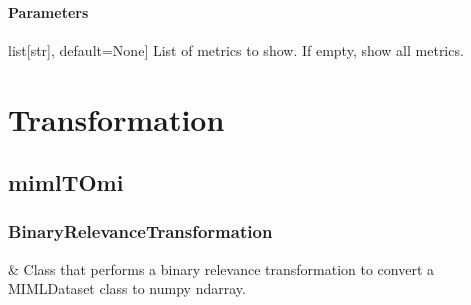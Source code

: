 \documentclass[letterpaper,10pt,english]{sphinxmanual}
\begin{document}
\begin{fulllineitems}
\begin{fulllineitems}
\subsubsection{Parameters}
\label{\detokenize{report/_autosummary/miml.report.report.Report:id2}}\begin{description}
\sphinxlineitem{metrics}{[}list{[}str{]}, default=None{]}
\sphinxAtStartPar
List of metrics to show. If empty, show all metrics.

\end{description}

\end{fulllineitems}


\end{fulllineitems}


\sphinxstepscope


\chapter{Transformation}
\label{\detokenize{transformation/index:transformation}}\label{\detokenize{transformation/index::doc}}
\sphinxstepscope


\section{mimlTOmi}
\label{\detokenize{transformation/mimlTOmi/index:mimltomi}}\label{\detokenize{transformation/mimlTOmi/index::doc}}
\sphinxstepscope


\subsection{BinaryRelevanceTransformation}
\label{\detokenize{transformation/mimlTOmi/binary_relevance_transformation:binaryrelevancetransformation}}\label{\detokenize{transformation/mimlTOmi/binary_relevance_transformation::doc}}

\begin{savenotes}\sphinxattablestart
\sphinxthistablewithglobalstyle
\sphinxthistablewithnovlinesstyle
\centering
\begin{tabulary}{\linewidth}[t]{}
\sphinxtoprule
\sphinxtableatstartofbodyhook
\sphinxAtStartPar
{\hyperref[\detokenize{transformation/mimlTOmi/_autosummary/miml.transformation.mimlTOmi.binary_relevance_transformation.BinaryRelevanceTransformation:miml.transformation.mimlTOmi.binary_relevance_transformation.BinaryRelevanceTransformation}]{}}
&
\sphinxAtStartPar
Class that performs a binary relevance transformation to convert a MIMLDataset class to numpy ndarray.
\\
\sphinxbottomrule
\end{tabulary}
\sphinxtableafterendhook\par
\sphinxattableend\end{savenotes}
\end{document}
